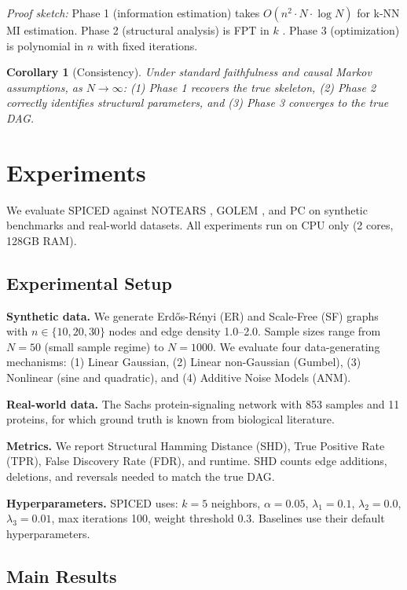 \documentclass{article}
\newtheorem{corollary}{Corollary}
\begin{document}
\textit{Proof sketch:} Phase 1 (information estimation) takes $O(n^2 \cdot N \cdot \log N)$ for k-NN MI estimation. Phase 2 (structural analysis) is FPT in $k$ \citep{ganian2024revisiting}. Phase 3 (optimization) is polynomial in $n$ with fixed iterations.

\begin{corollary}[Consistency]
Under standard faithfulness and causal Markov assumptions, as $N \rightarrow \infty$: (1) Phase 1 recovers the true skeleton, (2) Phase 2 correctly identifies structural parameters, and (3) Phase 3 converges to the true DAG.
\end{corollary}

\section{Experiments}

We evaluate SPICED against NOTEARS \citep{zheng2018dags}, GOLEM \citep{ng2020role}, and PC \citep{spirtes2000causation} on synthetic benchmarks and real-world datasets. All experiments run on CPU only (2 cores, 128GB RAM).

\subsection{Experimental Setup}

\textbf{Synthetic data.} We generate Erd\H{o}s-R\'enyi (ER) and Scale-Free (SF) graphs with $n \in \{10, 20, 30\}$ nodes and edge density 1.0--2.0. Sample sizes range from $N=50$ (small sample regime) to $N=1000$. We evaluate four data-generating mechanisms: (1) Linear Gaussian, (2) Linear non-Gaussian (Gumbel), (3) Nonlinear (sine and quadratic), and (4) Additive Noise Models (ANM).

\textbf{Real-world data.} The Sachs protein-signaling network \citep{sachs2005causal} with 853 samples and 11 proteins, for which ground truth is known from biological literature.

\textbf{Metrics.} We report Structural Hamming Distance (SHD), True Positive Rate (TPR), False Discovery Rate (FDR), and runtime. SHD counts edge additions, deletions, and reversals needed to match the true DAG.

\textbf{Hyperparameters.} SPICED uses: $k=5$ neighbors, $\alpha=0.05$, $\lambda_1=0.1$, $\lambda_2=0.0$, $\lambda_3=0.01$, max iterations 100, weight threshold 0.3. Baselines use their default hyperparameters.

\subsection{Main Results}
\end{document}
